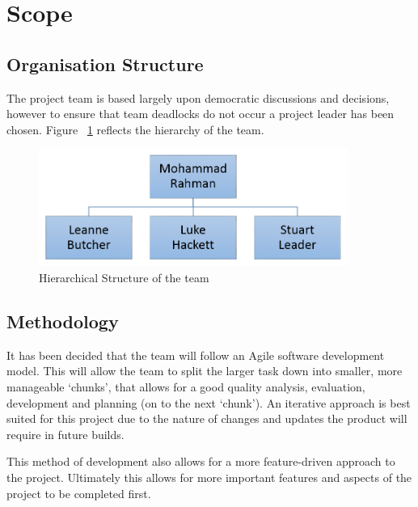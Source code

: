 \section{Scope}

\subsection{Organisation Structure}

The project team is based largely upon democratic discussions and decisions,
however to ensure that team deadlocks do not occur a project leader has been
chosen. Figure ~\ref{fig:org_hierachy} reflects the hierarchy of the team.

\begin{figure}[H]
  \centering
  \includegraphics[width=0.9\textwidth]{organisation_structure.png}
  \caption{Hierarchical Structure of the team}
  \label{fig:org_hierachy}
\end{figure}


\subsection{Methodology}

It has been decided that the team will follow an Agile software development
model. This will allow the team to split the larger task down into smaller, more
manageable `chunks', that allows for a good quality analysis, evaluation,
development and planning (on to the next `chunk'). An iterative approach is best
suited for this project due to the nature of changes and updates the product
will require in future builds.

This method of development also allows for a more feature-driven approach to the
project. Ultimately this allows for more important features and aspects of the
project to be completed first.


